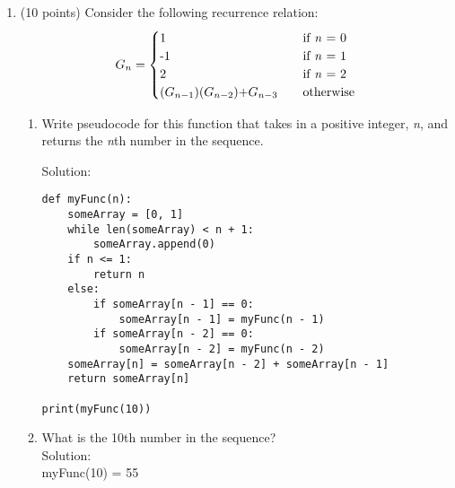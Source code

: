 \documentclass[12pt]{article}
\begin{document}
\begin{enumerate}
	\newpage

	\item (10 points) Consider the following recurrence relation:
	\[
	G_n =
		 \begin{cases}
		   \text{1} &\quad\text{if \textit{n} = 0}\\
		   \text{-1} &\quad\text{if \textit{n} = 1}\\
		   \text{2} &\quad\text{if \textit{n} = 2}\\
		   \text{($G_{n-1}$)($G_{n-2}$)+$G_{n-3}$} &\quad\text{otherwise}\\
		 \end{cases}
	\]
	
		 \begin{enumerate}
		 \item Write pseudocode for this function that takes in a positive integer, \textit{n}, and returns the \textit{n}th number in the sequence.
		 
		 Solution:\\
\begin{lstlisting} 
def myFunc(n):  
	someArray = [0, 1] 
	while len(someArray) < n + 1: 
		someArray.append(0) 
	if n <= 1: 
		return n 
	else: 
		if someArray[n - 1] == 0: 
			someArray[n - 1] = myFunc(n - 1) 	
		if someArray[n - 2] == 0: 
			someArray[n - 2] = myFunc(n - 2) 
	someArray[n] = someArray[n - 2] + someArray[n - 1] 
	return someArray[n] 
		
print(myFunc(10)) 

\end{lstlisting}
		 \item What is the 10th number in the sequence?\\
		Solution:\\
		myFunc(10) = 55
		 \end{enumerate}
	
	\end{enumerate}
	
	
\end{document}
